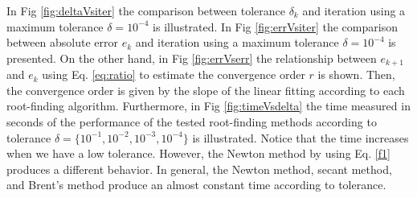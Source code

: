 \documentclass[11pt]{exam}
\begin{document}
In Fig \ref{fig:deltaVsiter} the comparison between tolerance $\delta_k$ and iteration using a maximum tolerance $\delta=10^{-4}$ is illustrated. In Fig \ref{fig:errVsiter} the comparison between absolute error $e_k$ and iteration using a maximum tolerance $\delta=10^{-4}$ is presented. On the other hand, in Fig \ref{fig:errVserr} the relationship between $e_{k+1}$ and $e_k$ using Eq. \ref{eq:ratio} to estimate the convergence order $r$ is shown. Then, the convergence order is given by the slope of the linear fitting according to each root-finding algorithm. Furthermore, in Fig \ref{fig:timeVsdelta} the time measured in seconds of the performance of the tested root-finding methods according to tolerance $\delta=\{10^{-1},10^{-2},10^{-3},10^{-4}\}$ is illustrated. Notice that the time increases when we have a low tolerance. However, the Newton method by using Eq. \ref{f1} produces a different behavior. In general, the Newton method, secant method, and Brent's method produce an almost constant time according to tolerance.
\end{document}
